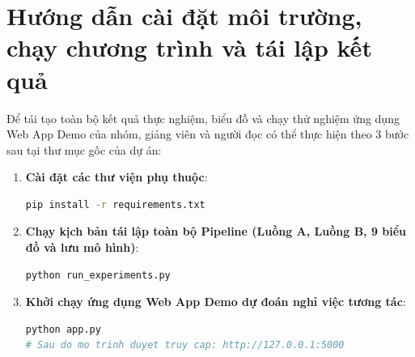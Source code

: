 \appendix
{}

\section*{Hướng dẫn cài đặt môi trường, chạy chương trình và tái lập kết quả}
Để tái tạo toàn bộ kết quả thực nghiệm, biểu đồ và chạy thử nghiệm ứng dụng Web App Demo của nhóm, giảng viên và người đọc có thể thực hiện theo $3$ bước sau tại thư mục gốc của dự án:
\begin{enumerate}
    \item \textbf{Cài đặt các thư viện phụ thuộc}:
    \begin{lstlisting}[language=bash]
pip install -r requirements.txt
    \end{lstlisting}
    \item \textbf{Chạy kịch bản tái lập toàn bộ Pipeline (Luồng A, Luồng B, 9 biểu đồ và lưu mô hình)}:
    \begin{lstlisting}[language=bash]
python run_experiments.py
    \end{lstlisting}
    \item \textbf{Khởi chạy ứng dụng Web App Demo dự đoán nghỉ việc tương tác}:
    \begin{lstlisting}[language=bash]
python app.py
# Sau do mo trinh duyet truy cap: http://127.0.0.1:5000
    \end{lstlisting}
\end{enumerate}

